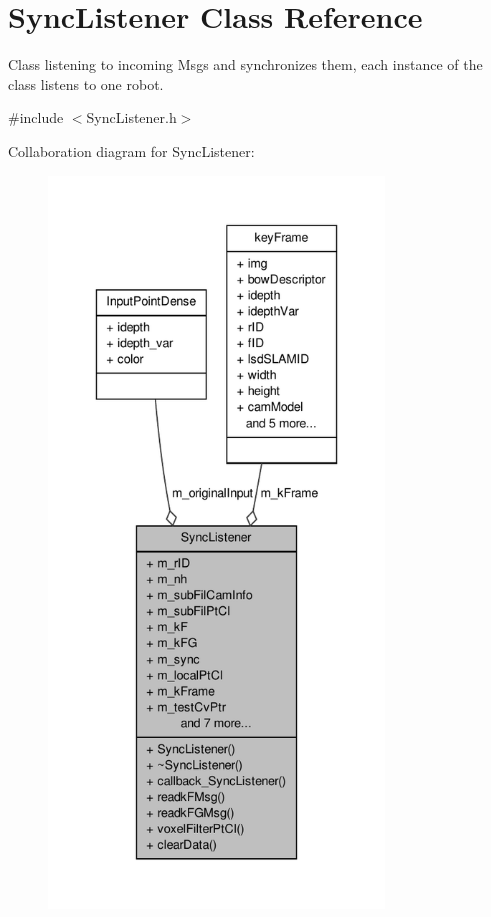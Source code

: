 \hypertarget{classSyncListener}{\section{\-Sync\-Listener \-Class \-Reference}
\label{classSyncListener}
}


\-Class listening to incoming \-Msgs and synchronizes them, each instance of the class listens to one robot.  




{\ttfamily \#include $<$\-Sync\-Listener.\-h$>$}



\-Collaboration diagram for \-Sync\-Listener\-:\nopagebreak
\begin{figure}[H]
\begin{center}
\leavevmode
\includegraphics[height=550pt]{classSyncListener__coll__graph}
\end{center}
\end{figure}
